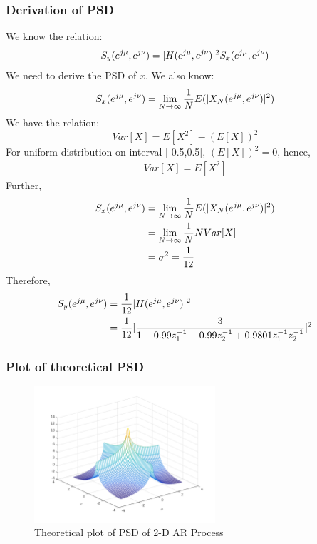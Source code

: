 \documentclass{article}
\DeclarePairedDelimiter{\abs}{\lvert}{\rvert}
\begin{document}
	\subsubsection{Derivation of PSD}
		We know the relation:
		\begin{equation}
			S_y(e^{j\mu},e^{j\nu}) = \abs{H(e^{j\mu},e^{j\nu})}^{2}S_x(e^{j\mu},e^{j\nu})
		\end{equation}
		We need to derive the PSD of $\textit{x}$.
		We also know:
		\begin{align*}
			S_x(e^{j\mu},e^{j\nu}) = \lim_{N\to\infty}\frac{1}{N}E(\abs{X_N(e^{j\mu},e^{j\nu})}^{2})
		\end{align*}
		We have the relation:
		\begin{equation}
			Var[X] = E[X^{2}]-(E[X])^{2}
		\end{equation}
		For uniform distribution on interval [-0.5,0.5], $(E[X])^{2}=0$, hence,
		\begin{align*}
			Var[X] = E[X^{2}]
		\end{align*}
		Further,
		\begin{align*}
			S_x(e^{j\mu},e^{j\nu}) &= \lim_{N\to\infty}\frac{1}{N}E(\abs{X_N(e^{j\mu},e^{j\nu})}^{2}) \\
								   &= \lim_{N\to\infty}\frac{1}{N}NVar[X] \\
								   & = \sigma^{2} = \frac{1}{12}
		\end{align*}
		Therefore,
		\begin{align*}
			S_y(e^{j\mu},e^{j\nu}) &= \frac{1}{12}\abs{H(e^{j\mu},e^{j\nu})}^{2} \\
								   &= \frac{1}{12}\abs{\frac{3}{1-0.99z_1^{-1}-0.99z_2^{-1}+0.9801z_1^{-1}z_2^{-1}}}^{2}
		\end{align*}
	\pagebreak
	\subsubsection{Plot of theoretical PSD} 
		\begin{figure}[h]
			\begin{center}
				\includegraphics[width=0.6\textwidth]{psd_theo.png}
				\caption{Theoretical plot of PSD of 2-D AR Process}
			\end{center}
		\end{figure}
\end{document}
